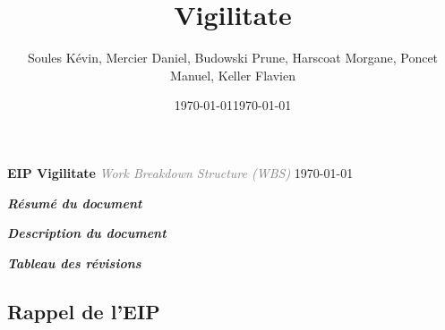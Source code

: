 \documentclass[a4paper,12pt]{report}
\title{\doctitle{} Vigilitate}
\author{Soules Kévin, Mercier Daniel, Budowski Prune, Harscoat Morgane, Poncet Manuel, Keller Flavien}
\date{\today}
\newcommand{\doctitle}{WBS}
\newcommand{\doclongtitle}{Work Breakdown Structure}
\begin{document}
\date{\slashdate\today}
\setcounter{page}{-10}


\thispagestyle{empty}
\begin{center}
  \textcolor{myBlue}{\Huge \textbf{EIP Vigilitate}}\linebreak
  \textcolor{gray}{\textit{\Large \doclongtitle{} (\doctitle{})}}\linebreak
  {\today}
\end{center}
\newpage


\begin{flushleft}
  \textcolor{myBlue}{\textit{\large \textbf{Résumé du document}}}\linebreak
\end{flushleft}

\newpage


\begin{flushleft}
  \textcolor{myBlue}{\textit{\large \textbf{Description du document}}} 
  \bigbreak
  
  \bigbreak
  \bigbreak
  \textcolor{myBlue}{\textit{\large \textbf{Tableau des révisions}}}
  \bigbreak
  
\end{flushleft}


\tableofcontents


\textcolor{myBlue}{\chapter{Rappel de l'EIP}}
\setcounter{page}{1}




\end{document}
